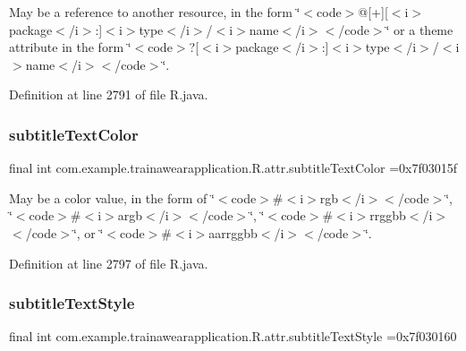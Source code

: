May be a reference to another resource, in the form \char`\"{}$<$code$>$@\mbox{[}+\mbox{]}\mbox{[}$<$i$>$package$<$/i$>$\+:\mbox{]}$<$i$>$type$<$/i$>$/$<$i$>$name$<$/i$>$$<$/code$>$\char`\"{} or a theme attribute in the form \char`\"{}$<$code$>$?\mbox{[}$<$i$>$package$<$/i$>$\+:\mbox{]}$<$i$>$type$<$/i$>$/$<$i$>$name$<$/i$>$$<$/code$>$\char`\"{}. 

Definition at line 2791 of file R.\+java.

\mbox{\label{classcom_1_1example_1_1trainawearapplication_1_1_r_1_1attr_a214c54ff67d3c203268ac8ebbd5af3ac}} 
\subsubsection{\texorpdfstring{subtitleTextColor}{subtitleTextColor}}
{\footnotesize\ttfamily final int com.\+example.\+trainawearapplication.\+R.\+attr.\+subtitle\+Text\+Color =0x7f03015f\hspace{0.3cm}{\ttfamily [static]}}

May be a color value, in the form of \char`\"{}$<$code$>$\#$<$i$>$rgb$<$/i$>$$<$/code$>$\char`\"{}, \char`\"{}$<$code$>$\#$<$i$>$argb$<$/i$>$$<$/code$>$\char`\"{}, \char`\"{}$<$code$>$\#$<$i$>$rrggbb$<$/i$>$$<$/code$>$\char`\"{}, or \char`\"{}$<$code$>$\#$<$i$>$aarrggbb$<$/i$>$$<$/code$>$\char`\"{}. 

Definition at line 2797 of file R.\+java.

\mbox{\label{classcom_1_1example_1_1trainawearapplication_1_1_r_1_1attr_a84589b06b3370917f4e1ff16956ace2b}} 
\subsubsection{\texorpdfstring{subtitleTextStyle}{subtitleTextStyle}}
{\footnotesize\ttfamily final int com.\+example.\+trainawearapplication.\+R.\+attr.\+subtitle\+Text\+Style =0x7f030160\hspace{0.3cm}{\ttfamily [static]}}

